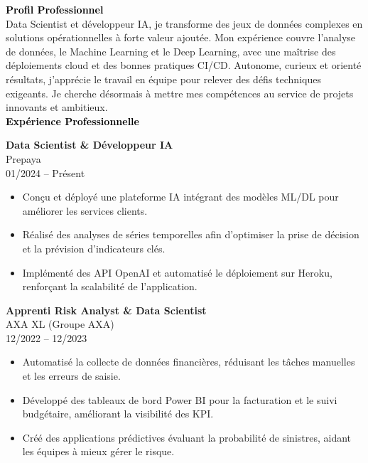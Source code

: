 \documentclass{article}
\begin{document}
\begin{paracol}{2}
\textcolor{black}{\Large \textbf{Profil Professionnel}} \\[2pt]
Data Scientist et développeur IA, je transforme des jeux de données complexes en solutions opérationnelles à forte valeur ajoutée. Mon expérience couvre l'analyse de données, le Machine Learning et le Deep Learning, avec une maîtrise des déploiements cloud et des bonnes pratiques CI/CD. Autonome, curieux et orienté résultats, j'apprécie le travail en équipe pour relever des défis techniques exigeants. Je cherche désormais à mettre mes compétences au service de projets innovants et ambitieux. \\[8pt]

\textcolor{black}{\Large \textbf{Expérience Professionnelle}} \\[2pt]

\colorbox{maincolor}{%
  \begin{minipage}{\linewidth}
    \textbf{Data Scientist \& Développeur IA} \\ Prepaya \\ 01/2024 – Présent
    \begin{itemize}
      \item Conçu et déployé une plateforme IA intégrant des modèles ML/DL pour améliorer les services clients. \item Réalisé des analyses de séries temporelles afin d’optimiser la prise de décision et la prévision d’indicateurs clés. \item Implémenté des API OpenAI et automatisé le déploiement sur Heroku, renforçant la scalabilité de l’application.
    \end{itemize}
  \end{minipage}}

\vspace{3mm}


\colorbox{maincolor}{%
  \begin{minipage}{\linewidth}
    \textbf{Apprenti Risk Analyst \& Data Scientist} \\ AXA XL (Groupe AXA) \\ 12/2022 – 12/2023
    \begin{itemize}
      \item Automatisé la collecte de données financières, réduisant les tâches manuelles et les erreurs de saisie. \item Développé des tableaux de bord Power BI pour la facturation et le suivi budgétaire, améliorant la visibilité des KPI. \item Créé des applications prédictives évaluant la probabilité de sinistres, aidant les équipes à mieux gérer le risque.
    \end{itemize}
  \end{minipage}}


\end{paracol}
\end{document}
